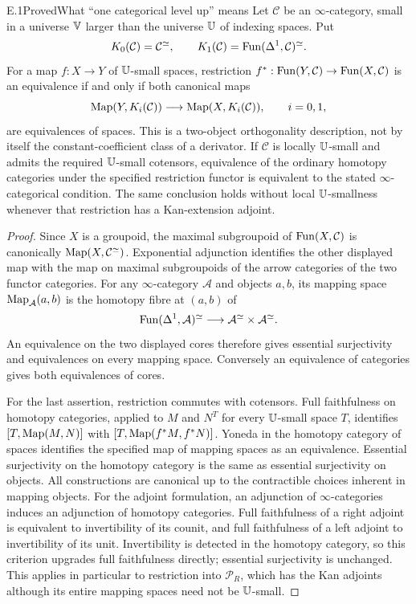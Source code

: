 \begin{claim}{E.1}{Proved}{What ``one categorical level up'' means}
Let $\mathcal C$ be an $\infty$-category, small in a universe $\mathbb V$ larger
than the universe $\mathbb U$ of indexing spaces.  Put
\[
 K_0(\mathcal C)=\mathcal C^{\simeq},\qquad
 K_1(\mathcal C)=\operatorname{Fun}(\Delta^1,\mathcal C)^{\simeq}.
\]
For a map $f:X\to Y$ of $\mathbb U$-small spaces, restriction
$f^*:\operatorname{Fun}(Y,\mathcal C)\to\operatorname{Fun}(X,\mathcal C)$ is an equivalence if and
only if both canonical maps
\[
 \operatorname{Map}(Y,K_i(\mathcal C))\longrightarrow\operatorname{Map}(X,K_i(\mathcal C)),
 \qquad i=0,1,
\]
are equivalences of spaces.  This is a two-object orthogonality
description, not by itself the constant-coefficient class of a derivator.
If $\mathcal C$ is locally $\mathbb U$-small and admits the required
$\mathbb U$-small cotensors, equivalence of the
ordinary homotopy categories under the specified restriction functor is
equivalent to the stated $\infty$-categorical condition.  The same
conclusion holds without local $\mathbb U$-smallness whenever that
restriction has a Kan-extension adjoint.
\end{claim}
\begin{proof}
Since $X$ is a groupoid, the maximal subgroupoid of $\operatorname{Fun}(X,\mathcal C)$
is canonically $\operatorname{Map}(X,\mathcal C^{\simeq})$.  Exponential adjunction
identifies the other displayed map with the map on maximal subgroupoids
of the arrow categories of the two functor categories.  For any
$\infty$-category $\mathcal A$ and objects $a,b$, its mapping space
$\operatorname{Map}_{\mathcal A}(a,b)$ is the homotopy fibre at $(a,b)$ of
\[
 \operatorname{Fun}(\Delta^1,\mathcal A)^{\simeq}\longrightarrow
 \mathcal A^{\simeq}\times\mathcal A^{\simeq}.
\]
An equivalence on the two displayed cores therefore gives essential
surjectivity and equivalences on every mapping space.  Conversely an
equivalence of categories gives both equivalences of cores.

For the last assertion, restriction commutes with cotensors.  Full
faithfulness on homotopy categories, applied to $M$ and $N^T$ for every
$\mathbb U$-small space $T$, identifies
$[T,\operatorname{Map}(M,N)]$ with $[T,\operatorname{Map}(f^*M,f^*N)]$.  Yoneda in the homotopy
category of spaces identifies the specified map of mapping spaces as an
equivalence.  Essential surjectivity on the homotopy category is the
same as essential surjectivity on objects.  All constructions are
canonical up to the contractible choices inherent in mapping objects.
For the adjoint formulation, an adjunction of $\infty$-categories
induces an adjunction of homotopy categories.  Full faithfulness
of a right adjoint is equivalent to invertibility of its counit,
and full faithfulness of a left adjoint to invertibility of its
unit.  Invertibility is detected in the homotopy category, so this
criterion upgrades full faithfulness directly; essential
surjectivity is unchanged.  This applies in particular to
restriction into $\mathcal P_R$, which has the Kan adjoints
although its entire mapping spaces need not be $\mathbb U$-small.
\end{proof}

